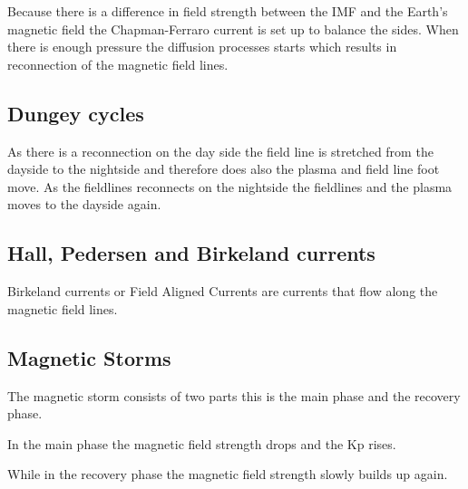 Because there is a difference in field strength between the IMF and the Earth's magnetic field the Chapman-Ferraro current is set up to balance the sides. When there is enough pressure the diffusion processes starts which results in reconnection of the magnetic field lines. 




\subsection{Dungey cycles}

As there is a reconnection on the day side the field line is stretched from the dayside to the nightside and therefore does also the plasma and field line foot move. As the fieldlines reconnects on the nightside the fieldlines and the plasma moves to the dayside again. 


\subsection{Hall, Pedersen and Birkeland currents}


Birkeland currents or Field Aligned Currents are currents that flow along the magnetic field lines. 


\subsection{Magnetic Storms}

The magnetic storm consists of two parts this is the main phase and the recovery phase. 

In the main phase the magnetic field strength drops and the Kp rises.

While in the recovery phase the magnetic field strength slowly builds up again. 


 

